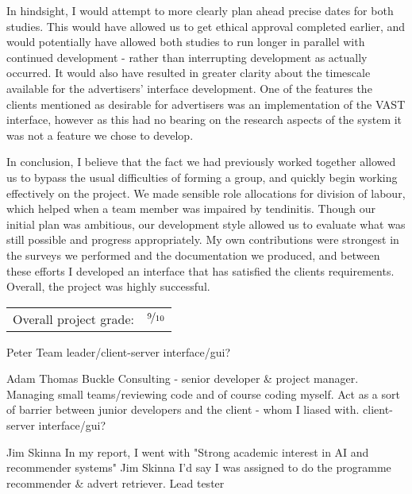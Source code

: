 In hindsight, I would attempt to more clearly plan ahead precise dates for both studies. This would have allowed us to get ethical approval completed earlier, and would potentially have allowed both studies to run longer in parallel with continued development - rather than interrupting development as actually occurred. It would also have resulted in greater clarity about the timescale available for the advertisers' interface development. One of the features the clients mentioned as desirable for advertisers was an implementation of the VAST interface, however as this had no bearing on the research aspects of the system it was not a feature we chose to develop.

In conclusion, I believe that the fact we had previously worked together allowed us to bypass the usual difficulties of forming a group, and quickly begin working effectively on the project. We made sensible role allocations for division of labour, which helped when a team member was impaired by tendinitis. Though our initial plan was ambitious, our development style allowed us to evaluate what was still possible and progress appropriately. My own contributions were strongest in the surveys we performed and the documentation we produced, and between these efforts I developed an interface that has satisfied the clients requirements. Overall, the project was highly successful.

\hfill \begin{tabular}{l l}
	Overall project grade: & $\nicefrac{9}{10}$ \\
\end{tabular}


\begingroup
\parindent 0pt
\parskip 2pt
\def\enotesize{\small}
\theendnotes
\endgroup

% 



Peter Team leader/client-server interface/gui?

Adam Thomas Buckle Consulting - senior developer & project manager. Managing small teams/reviewing code and of course coding myself. Act as a sort of barrier between junior developers and the client - whom I liased with. client-server interface/gui?

Jim Skinna In my report, I went with "Strong academic interest in AI and recommender systems" Jim Skinna I'd say I was assigned to do the programme recommender & advert retriever. Lead tester


